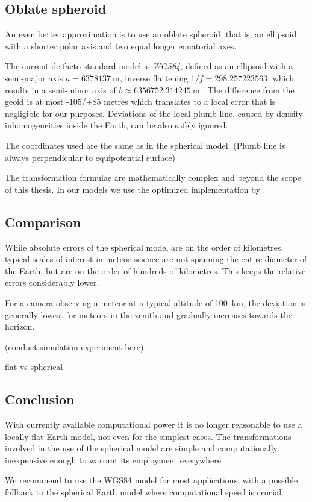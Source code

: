     \subsection{Oblate spheroid} \label{mmo}
        An even better approximation is to use an oblate spheroid,
        that is, an ellipsoid with a shorter polar axis and two
        equal longer equatorial axes.

        The current de facto standard model is \emph{WGS84}, defined as an ellipsoid
        with a semi-major axis $a = \SI{6378137}{\metre}$, inverse flattening
        $1/f = \num{298.257223563}$, which results in a semi-minor axis of
        $b \approx \SI{6356752.314245}{\metre}$ \cite{???}.
        The difference from the geoid is at most -105/+85 metres \cite{???}
        which translates to a local error that is negligible for our purposes.
        Deviations of the local plumb line, caused by density inhomogeneities
        inside the Earth, can be also safely ignored.

        The coordinates used are the same as in the spherical model. (Plumb line is always perpendicular to equipotential surface)

        The transformation formulae are mathematically complex and beyond the scope of this thesis.
        In our models we use the optimized implementation by \citet{osen2017}.

    \subsection{Comparison} \label{mmc}
        While absolute errors of the spherical model are on the order of kilometres,
        typical scales of interest in meteor science are not spanning the entire diameter of the Earth,
        but are on the order of hundreds of kilometres. This keeps the relative errors considerably lower.

        For a camera observing a meteor at a typical altitude of \SI{100}{\kilo\metre},
        the deviation is generally lowest for meteors in the zenith
        and gradually increases towards the horizon.

        (conduct simulation experiment here)

        flat vs spherical

    \subsection{Conclusion}
        With currently available computational power it is no longer reasonable to
        use a locally-flat Earth model, not even for the simplest cases.
        The transformations involved in the use of the spherical model
        are simple and computationally inexpensive enough to warrant its employment everywhere.

        We recommend to use the WGS84 model for most applications, with a possible
        fallback to the spherical Earth model where computational speed is crucial.
